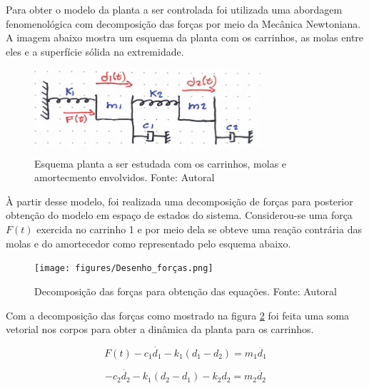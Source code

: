 \documentclass{ifacconf}
\begin{document}
Para obter o modelo da planta a ser controlada foi utilizada uma abordagem fenomenológica com decomposição das forças por meio da Mecânica Newtoniana. A imagem abaixo mostra um esquema da planta com os carrinhos, as molas entre eles e a superfície sólida na extremidade.

\begin{figure}[!htb]
    \begin{center}
    \includegraphics[width=8.4cm]{figures/Desenho_planta.png}    %
    \caption{Esquema planta a ser estudada com os carrinhos, molas e amortecmento envolvidos. Fonte: Autoral} 
    \label{fig:Desenho_planta}
    \end{center}
  \end{figure}

À partir desse modelo, foi realizada uma decomposição de forças para posterior obtenção do modelo em espaço de estados do sistema. Considerou-se uma força $F(t)$ exercida no carrinho 1 e por meio dela se obteve uma reação contrária das molas e do amortecedor como representado pelo esquema abaixo.

\begin{figure}[!htb]
    \begin{center}
    \texttt{[image: figures/Desenho\_forças.png]}    %
    \caption{Decomposição das forças para obtenção das equações. Fonte: Autoral} 
    \label{fig:Desenho_forças}
    \end{center}
  \end{figure}

Com a decomposição das forças como mostrado na figura \ref{fig:Desenho_forças} foi feita uma soma vetorial nos corpos para obter a dinâmica da planta para os carrinhos.

\begin{equation}
    \label{eq:planta 1}
    F(t) - c_{1}\dot{d_{1}} - k_{1}(d_{1}-d_{2}) = m_{1}\ddot{d_{1}}
\end{equation}

\begin{equation}
    \label{eq:planta 2}
    - c_{2}\dot{d_{2}} - k_{1}(d_{2}-d_{1}) - k_{2}d_{2} = m_{2}\ddot{d_{2}}
\end{equation}
\end{document}
